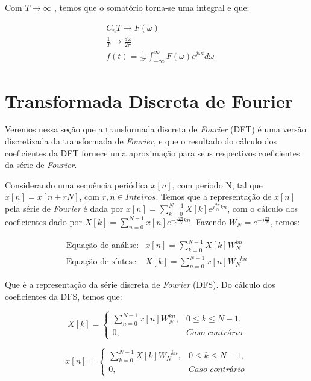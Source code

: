 \documentclass[monografia]{subfiles}
\begin{document}
			Com $T \rightarrow \infty$ , temos que o somatório torna-se uma integral e que:
							
			\begin{align}
				&C_{n}T\rightarrow F(\omega)\\
				&\frac{1}{T} \rightarrow \frac{d\omega}{2\pi} \\
				&f(t) = \frac{1}{2\pi} \int_{-\infty}^{\infty}F(\omega)e^{j \omega t}d\omega
			\end{align}

		\newpage

	\section{Transformada Discreta de Fourier}
	\label{sec:digitalFourierTransform}
		Veremos nessa seção que a transformada discreta de \textit{Fourier} (DFT) é uma versão discretizada da transformada de \textit{Fourier}, 
		e que o resultado do cálculo dos coeficientes da DFT fornece uma aproximação para seus respectivos coeficientes da série de \textit{Fourier}.

		Considerando uma sequência periódica $x[n]$, com período N, tal que $x[n] = x[n+rN]$, com $r,n \in {Inteiros}$. Temos que a representação
		de $x[n]$ pela série de \textit{Fourier}  é dada por $x[n] = \sum_{k=0}^{N-1}X[k] e^{j \frac{2\pi}{N} kn}$, 
		com o cálculo dos coeficientes dado por $X[k] = \sum_{n=0}^{N-1}x[n] e^{-j \frac{2\pi}{N} kn}$. Fazendo $W_{N}=e^{-j \frac{2\pi}{N} }$, temos:

		\begin{align}
			\textrm{Equação de análise}: &x[n] = \sum_{k=0}^{N-1}X[k] W_{N}^{kn} \\
			\textrm{Equação de síntese}: &X[k] = \sum_{n=0}^{N-1}x[n] W_{N}^{-kn}
		\end{align}

		Que é a representação da série discreta de \textit{Fourier} (DFS). Do cálculo dos coeficientes da DFS, temos que:

		 \begin{equation}
		 \label{eq:DFT1}
				X[k] = \left\{\begin{array}{rc}
				\sum_{n=0}^{N-1}x[n] W_{N}^{kn},& 0 \le k \le N-1,\\
				0																			,& \textit{Caso contrário}
			\end{array}\right.
			\end{equation}

			\begin{equation}
				x[n] = \left\{\begin{array}{rc}
				\sum_{k=0}^{N-1}X[k] W_{N}^{-kn},& 0 \le k \le N-1,\\
				0																			,& \textit{Caso contrário}
			\end{array}\right.
			\end{equation}
\end{document}
